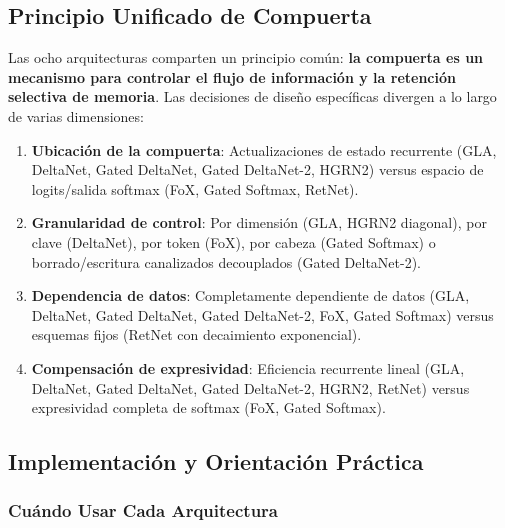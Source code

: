 \documentclass[11pt,a4paper]{article}
\begin{document}
\subsection{Principio Unificado de Compuerta}

Las ocho arquitecturas comparten un principio común: \textbf{la compuerta es un mecanismo para controlar el flujo de información y la retención selectiva de memoria}. Las decisiones de diseño específicas divergen a lo largo de varias dimensiones:

\begin{enumerate}[leftmargin=*]
    \item \textbf{Ubicación de la compuerta}: Actualizaciones de estado recurrente (GLA, DeltaNet, Gated DeltaNet, Gated DeltaNet-2, HGRN2) versus espacio de logits/salida softmax (FoX, Gated Softmax, RetNet).
    \item \textbf{Granularidad de control}: Por dimensión (GLA, HGRN2 diagonal), por clave (DeltaNet), por token (FoX), por cabeza (Gated Softmax) o borrado/escritura canalizados decouplados (Gated DeltaNet-2).
    \item \textbf{Dependencia de datos}: Completamente dependiente de datos (GLA, DeltaNet, Gated DeltaNet, Gated DeltaNet-2, FoX, Gated Softmax) versus esquemas fijos (RetNet con decaimiento exponencial).
    \item \textbf{Compensación de expresividad}: Eficiencia recurrente lineal (GLA, DeltaNet, Gated DeltaNet, Gated DeltaNet-2, HGRN2, RetNet) versus expresividad completa de softmax (FoX, Gated Softmax).
\end{enumerate}

\subsection{Implementación y Orientación Práctica}

\subsubsection{Cuándo Usar Cada Arquitectura}
\end{document}
